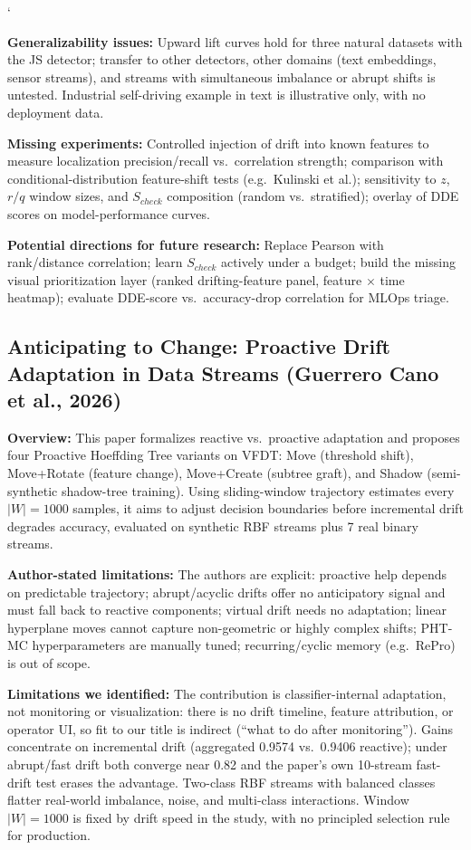 `\documentclass[10pt]{article}
\newcommand{\sumitem}[2]{\noindent\textbf{#1:} #2\par}
\begin{document}
\sumitem{Generalizability issues}{Upward lift curves hold for three natural datasets with the JS detector; transfer to other detectors, other domains (text embeddings, sensor streams), and streams with simultaneous imbalance or abrupt shifts is untested. Industrial self-driving example in text is illustrative only, with no deployment data.}

\sumitem{Missing experiments}{Controlled injection of drift into known features to measure localization precision/recall vs.\ correlation strength; comparison with conditional-distribution feature-shift tests (e.g.\ Kulinski et al.); sensitivity to $z$, $r/q$ window sizes, and $S_{check}$ composition (random vs.\ stratified); overlay of DDE scores on model-performance curves.}

\sumitem{Potential directions for future research}{Replace Pearson with rank/distance correlation; learn $S_{check}$ actively under a budget; build the missing visual prioritization layer (ranked drifting-feature panel, feature $\times$ time heatmap); evaluate DDE-score vs.\ accuracy-drop correlation for MLOps triage.}

\clearpage
\subsection{Anticipating to Change: Proactive Drift Adaptation in Data Streams (Guerrero Cano et al., 2026)}

\sumitem{Overview}{This paper formalizes reactive vs.\ proactive adaptation and proposes four Proactive Hoeffding Tree variants on VFDT: Move (threshold shift), Move+Rotate (feature change), Move+Create (subtree graft), and Shadow (semi-synthetic shadow-tree training). Using sliding-window trajectory estimates every $|W|=1000$ samples, it aims to adjust decision boundaries before incremental drift degrades accuracy, evaluated on synthetic RBF streams plus 7 real binary streams.}

\sumitem{Author-stated limitations}{The authors are explicit: proactive help depends on predictable trajectory; abrupt/acyclic drifts offer no anticipatory signal and must fall back to reactive components; virtual drift needs no adaptation; linear hyperplane moves cannot capture non-geometric or highly complex shifts; PHT-MC hyperparameters are manually tuned; recurring/cyclic memory (e.g.\ RePro) is out of scope.}

\sumitem{Limitations we identified}{The contribution is classifier-internal adaptation, not monitoring or visualization: there is no drift timeline, feature attribution, or operator UI, so fit to our title is indirect (``what to do after monitoring''). Gains concentrate on incremental drift (aggregated 0.9574 vs.\ 0.9406 reactive); under abrupt/fast drift both converge near 0.82 and the paper's own 10-stream fast-drift test erases the advantage. Two-class RBF streams with balanced classes flatter real-world imbalance, noise, and multi-class interactions. Window $|W|=1000$ is fixed by drift speed in the study, with no principled selection rule for production.}
\end{document}
